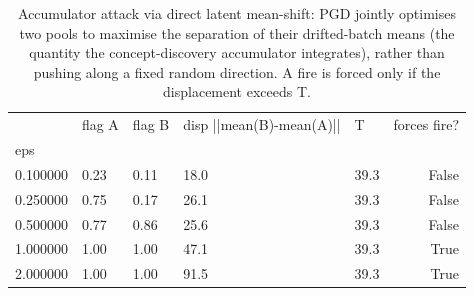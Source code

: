 \begin{table}
\caption{Accumulator attack via direct latent mean-shift: PGD jointly optimises two pools to maximise the separation of their drifted-batch means (the quantity the concept-discovery accumulator integrates), rather than pushing along a fixed random direction. A fire is forced only if the displacement exceeds T.}
\label{tab:rq3-pgd-meanshift}
\begin{tabular}{lllllr}
\toprule
 & flag A & flag B & disp ||mean(B)-mean(A)|| & T & forces fire? \\
eps &  &  &  &  &  \\
\midrule
0.100000 & 0.23 & 0.11 & 18.0 & 39.3 & False \\
0.250000 & 0.75 & 0.17 & 26.1 & 39.3 & False \\
0.500000 & 0.77 & 0.86 & 25.6 & 39.3 & False \\
1.000000 & 1.00 & 1.00 & 47.1 & 39.3 & True \\
2.000000 & 1.00 & 1.00 & 91.5 & 39.3 & True \\
\bottomrule
\end{tabular}
\end{table}
